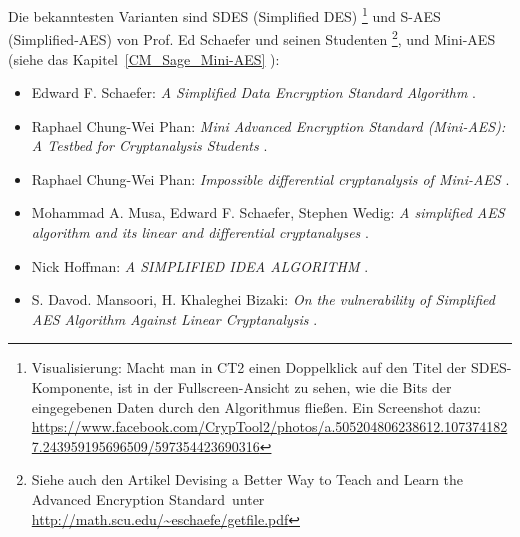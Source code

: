Die bekanntesten Varianten sind SDES (Simplified DES)%
\footnote{
  Visualisierung: Macht man in CT2 einen Doppelklick auf den Titel der
  SDES-Komponente, ist in der Fullscreen-Ansicht
  zu sehen, wie die Bits der eingegebenen Daten durch den Algorithmus fließen.
  Ein Screen\-shot dazu:
  \url{https://www.facebook.com/CrypTool2/photos/a.505204806238612.1073741827.243959195696509/597354423690316}
}
und S-AES (Simplified-AES) von Prof. Ed Schaefer und seinen Studenten%
\footnote{
    Siehe auch den Artikel \glqq Devising a Better Way to Teach and Learn
    the Advanced Encryption Standard\grqq~unter
    \url{http://math.scu.edu/~eschaefe/getfile.pdf}
},
und Mini-AES (siehe das Kapitel~\ref{CM_Sage_Mini-AES} \glqq {}\grqq):

\begin{itemize}

\item Edward F. Schaefer: {\em A Simplified Data Encryption Standard Algorithm} 
      \cite{Schaefer1996}.

\item Raphael Chung-Wei Phan: {\em Mini Advanced Encryption Standard (Mini-AES):
                                   A Testbed for Cryptanalysis Students} 
      \cite{Phan2002}.

\item Raphael Chung-Wei Phan: {\em Impossible differential cryptanalysis of Mini-AES} 
      \cite{Phan2003}.

\item Mohammad A. Musa, Edward F. Schaefer, Stephen Wedig:
      {\em A simplified AES algorithm and its linear and differential cryptanalyses} 
      \cite{Musa2003}.

\item Nick Hoffman: {\em A SIMPLIFIED IDEA ALGORITHM} 
      \cite{Hoffman2006}.

\item S. Davod. Mansoori, H. Khaleghei Bizaki: 
      {\em On the vulnerability of Simplified AES Algorithm Against Linear Cryptanalysis} 
      \cite{Mansoori2007}.

\end{itemize}



